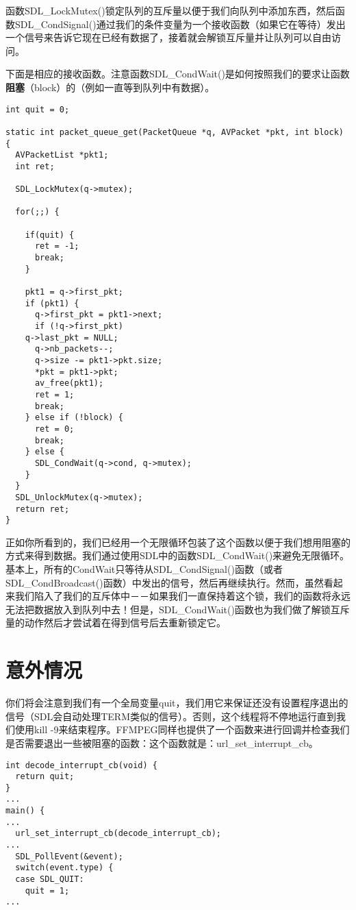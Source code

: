函数SDL_LockMutex()锁定队列的互斥量以便于我们向队列中添加东西，然后函数SDL_CondSignal()通过我们的条件变量为一个接收函数（如果它在等待）发出一个信号来告诉它现在已经有数据了，接着就会解锁互斥量并让队列可以自由访问。

下面是相应的接收函数。注意函数SDL_CondWait()是如何按照我们的要求让函数\textbf{阻塞}（block）的（例如一直等到队列中有数据）。
\begin{lstlisting}
int quit = 0;

static int packet_queue_get(PacketQueue *q, AVPacket *pkt, int block) {
  AVPacketList *pkt1;
  int ret;

  SDL_LockMutex(q->mutex);

  for(;;) {

    if(quit) {
      ret = -1;
      break;
    }

    pkt1 = q->first_pkt;
    if (pkt1) {
      q->first_pkt = pkt1->next;
      if (!q->first_pkt)
    q->last_pkt = NULL;
      q->nb_packets--;
      q->size -= pkt1->pkt.size;
      *pkt = pkt1->pkt;
      av_free(pkt1);
      ret = 1;
      break;
    } else if (!block) {
      ret = 0;
      break;
    } else {
      SDL_CondWait(q->cond, q->mutex);
    }
  }
  SDL_UnlockMutex(q->mutex);
  return ret;
}
\end{lstlisting}

正如你所看到的，我们已经用一个无限循环包装了这个函数以便于我们想用阻塞的方式来得到数据。我们通过使用SDL中的函数SDL_CondWait()来避免无限循环。基本上，所有的CondWait只等待从SDL_CondSignal()函数（或者SDL_CondBroadcast()函数）中发出的信号，然后再继续执行。然而，虽然看起来我们陷入了我们的互斥体中－－如果我们一直保持着这个锁，我们的函数将永远无法把数据放入到队列中去！但是，SDL_CondWait()函数也为我们做了解锁互斥量的动作然后才尝试着在得到信号后去重新锁定它。

\section{意外情况}

你们将会注意到我们有一个全局变量quit，我们用它来保证还没有设置程序退出的信号（SDL会自动处理TERM类似的信号）。否则，这个线程将不停地运行直到我们使用kill -9来结束程序。FFMPEG同样也提供了一个函数来进行回调并检查我们是否需要退出一些被阻塞的函数：这个函数就是：url_set_interrupt_cb。

\begin{lstlisting}
int decode_interrupt_cb(void) {
  return quit;
}
...
main() {
...
  url_set_interrupt_cb(decode_interrupt_cb);
...
  SDL_PollEvent(&event);
  switch(event.type) {
  case SDL_QUIT:
    quit = 1;
...
\end{lstlisting}

